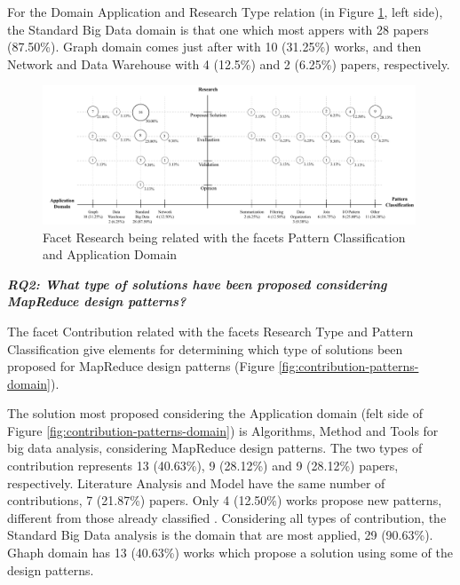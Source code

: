 For the Domain Application and Research Type relation (in Figure
\ref{fig:research-patterns-domain}, left side), the Standard Big Data domain is
that one which most appers with 28 papers (87.50\%). Graph domain comes just
after with 10 (31.25\%) works, and then Network and Data Warehouse with 4
(12.5\%) and 2 (6.25\%) papers, respectively.  

\begin{figure}[hbtp]
\centering
\includegraphics[width=0.99\textwidth]{figs/Research-Patterns-Domain.pdf}
\caption{Facet Research being related with the facets Pattern
Classification and Application Domain}
\label{fig:research-patterns-domain}
\end{figure}

  
\bigskip
\textbf{\textit{RQ2: What type of solutions have been proposed considering
MapReduce design patterns?}}

The facet Contribution related with the facets Research Type and Pattern
Classification give elements for determining which type of solutions been
proposed for MapReduce design patterns (Figure
\ref{fig:contribution-patterns-domain}).

The solution most proposed considering the Application domain (felt side of
Figure \ref{fig:contribution-patterns-domain}) is Algorithms, Method and Tools
for big data analysis, considering MapReduce design patterns. The two types of
contribution represents 13 (40.63\%), 9 (28.12\%) and 9 (28.12\%) papers,
respectively. Literature Analysis and Model have the same number of
contributions, 7 (21.87\%) papers. Only 4 (12.50\%) works propose new patterns,
different from those already classified
\cite{White:2012,pig-designpattern:2014}. Considering all types of contribution,
the Standard Big Data analysis is the domain that are most applied, 29
(90.63\%). Ghaph domain has 13 (40.63\%) works which propose a solution using
some of the design patterns.


